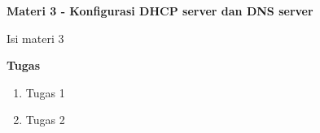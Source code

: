 \documentclass{article}
\begin{document}
    \begin{flushleft}
        \textbf{Materi 3 - Konfigurasi DHCP server dan DNS server}
        \newline

        Isi materi 3
    \end{flushleft}

    \newpage
    \begin{flushleft}
        \textbf{Tugas}
        \newline

        \begin{enumerate}
            \item Tugas 1
            \item Tugas 2
        \end{enumerate}
    \end{flushleft}
\end{document}
